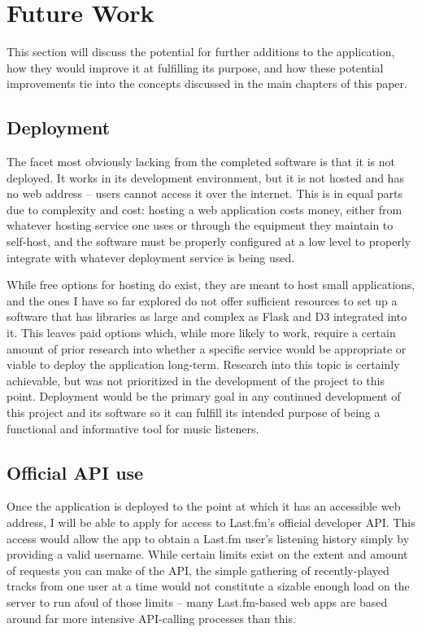 \chapter{Future Work}\label{future}

This section will discuss the potential for further additions to the application, how they would improve it at fulfilling its purpose, and how these potential improvements tie into the concepts discussed in the main chapters of this paper.

\section{Deployment}\label{deploy}

The facet most obviously lacking from the completed software is that it is not deployed. It works in its development environment, but it is not hosted and has no web address -- users cannot access it over the internet. This is in equal parts due to complexity and cost: hosting a web application costs money, either from whatever hosting service one uses or through the equipment they maintain to self-host, and the software must be properly configured at a low level to properly integrate with whatever deployment service is being used.

While free options for hosting do exist, they are meant to host small applications, and the ones I have so far explored do not offer sufficient resources to set up a software that has libraries as large and complex as Flask and D3 integrated into it. This leaves paid options which, while more likely to work, require a certain amount of prior research into whether a specific service would be appropriate or viable to deploy the application long-term. Research into this topic is certainly achievable, but was not prioritized in the development of the project to this point. Deployment would be the primary goal in any continued development of this project and its software so it can fulfill its intended purpose of being a functional and informative tool for music listeners.

\section{Official API use}\label{useapi}

Once the application is deployed to the point at which it has an accessible web address, I will be able to apply for access to Last.fm's official developer API. This access would allow the app to obtain a Last.fm user's listening history simply by providing a valid username. While certain limits exist on the extent and amount of requests you can make of the API, the simple gathering of recently-played tracks from one user at a time would not constitute a sizable enough load on the server to run afoul of those limits -- many Last.fm-based web apps are based around far more intensive API-calling processes than this.

